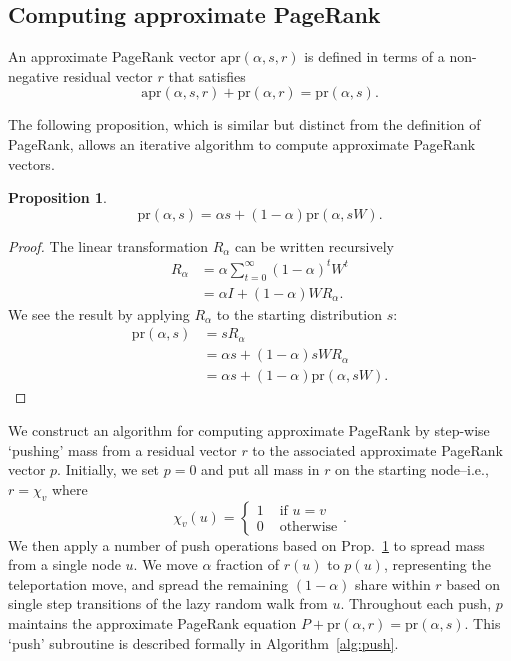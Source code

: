 \documentclass[11pt]{article}
\newtheorem{proposition}{Proposition}[section]
\begin{document}
\subsection*{Computing approximate PageRank}
An approximate PageRank vector $\text{apr}(\alpha,s,r)$ is defined in terms of a non-negative residual vector $r$ that satisfies
$$\text{apr}(\alpha,s,r) + \text{pr}(\alpha,r) = \text{pr}(\alpha,s).$$

The following proposition, which is similar but distinct from the definition of PageRank, allows an iterative algorithm to compute approximate PageRank vectors.

\begin{proposition} \label{prop:push}
$$\text{pr}(\alpha,s) = \alpha s + (1-\alpha) \text{pr}(\alpha,sW).$$
\end{proposition}

\begin{proof}
The linear transformation $R_\alpha$ can be written recursively
$$\begin{aligned}
R_\alpha &= \alpha \sum_{t=0}^\infty (1-\alpha)^t W^t \\
	&= \alpha I + (1-\alpha) W R_\alpha.
\end{aligned}$$
We see the result by applying $R_\alpha$ to the starting distribution $s$:
$$\begin{aligned}
\text{pr}(\alpha,s) &= sR_\alpha \\
	&= \alpha s + (1-\alpha) s W R_\alpha \\
	&= \alpha s + (1-\alpha) \text{pr}(\alpha, sW).
\end{aligned}$$
\end{proof}

We construct an algorithm for computing approximate PageRank by step-wise `pushing' mass from a residual vector $r$ to the associated approximate PageRank vector $p$. Initially, we set $p = 0$ and put all mass in $r$ on the starting node--i.e., $r=\chi_v$ where
$$\chi_v(u) = \begin{cases} 1 & \text{ if } u = v \\ 0 & \text{ otherwise}\end{cases}.$$
We then apply a number of push operations based on Prop.~\ref{prop:push} to spread mass from a single node $u$. We move $\alpha$ fraction of $r(u)$ to $p(u)$, representing the teleportation move, and spread the remaining $(1-\alpha)$ share within $r$ based on single step transitions of the lazy random walk from $u$. Throughout each push, $p$ maintains the approximate PageRank equation $P + \text{pr}(\alpha,r) = \text{pr}(\alpha,s)$. This `push' subroutine is described formally in Algorithm~\ref{alg:push}.
\end{document}
